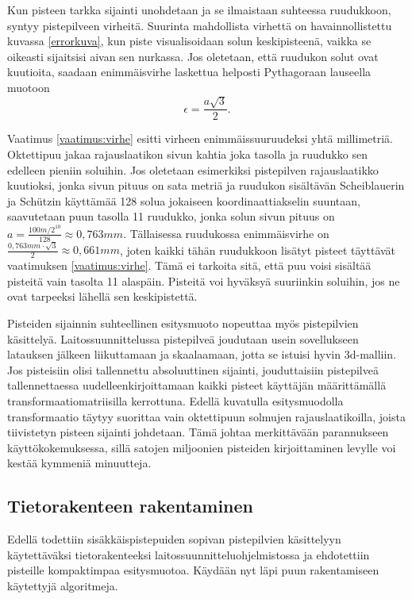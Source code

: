 Kun pisteen tarkka sijainti unohdetaan ja se ilmaistaan suhteessa ruudukkoon, syntyy pistepilveen virheitä. Suurinta mahdollista virhettä on havainnollistettu kuvassa \ref{errorkuva}, kun piste visualisoidaan solun keskipisteenä, vaikka se oikeasti sijaitsisi aivan sen nurkassa. Jos oletetaan, että ruudukon solut ovat kuutioita, saadaan enimmäisvirhe laskettua helposti Pythagoraan lauseella muotoon 
\begin{equation}
    \epsilon = \frac{a \sqrt{3}}{2}.      
\end{equation}

Vaatimus \ref{vaatimus:virhe} esitti virheen enimmäissuuruudeksi yhtä millimetriä. Oktettipuu jakaa rajauslaatikon sivun kahtia joka tasolla ja ruudukko sen edelleen pieniin soluihin. Jos oletetaan esimerkiksi pistepilven rajauslaatikko kuutioksi, jonka sivun pituus on sata metriä ja ruudukon sisältävän Scheiblauerin ja Schützin käyttämää 128 solua jokaiseen koordinaattiakselin suuntaan, saavutetaan puun tasolla 11 ruudukko, jonka solun sivun pituus on $a = \frac{100m/2^{10}}{128} \approx 0,763mm$. Tällaisessa ruudukossa enimmäisvirhe on $\frac{0,763mm \cdot \sqrt{3}}{2} \approx 0,661mm$, joten kaikki tähän ruudukkoon lisätyt pisteet täyttävät vaatimuksen \ref{vaatimus:virhe}. Tämä ei tarkoita sitä, että puu voisi sisältää pisteitä vain tasolta 11 alaspäin. Pisteitä voi hyväksyä suuriinkin soluihin, jos ne ovat tarpeeksi lähellä sen keskipistettä.

Pisteiden sijainnin suhteellinen esitysmuoto nopeuttaa myös pistepilvien käsittelyä. Laitossuunnittelussa pistepilveä joudutaan usein sovellukseen latauksen jälkeen liikuttamaan ja skaalaamaan, jotta se istuisi hyvin 3d-malliin. Jos pisteisiin olisi tallennettu absoluuttinen sijainti, jouduttaisiin pistepilveä tallennettaessa uudelleenkirjoittamaan kaikki pisteet käyttäjän määrittämällä transformaatiomatriisilla kerrottuna. Edellä kuvatulla esitysmuodolla transformaatio täytyy suorittaa vain oktettipuun solmujen rajauslaatikoilla, joista tiivistetyn pisteen sijainti johdetaan. Tämä johtaa merkittävään parannukseen käyttökokemuksessa, sillä satojen miljoonien pisteiden kirjoittaminen levylle voi kestää kymmeniä minuutteja.

\subsection{Tietorakenteen rakentaminen}

Edellä todettiin sisäkkäispistepuiden sopivan pistepilvien käsittelyyn käytettäväksi tietorakenteeksi laitossuunnitteluohjelmistossa ja ehdotettiin pisteille kompaktimpaa esitysmuotoa. Käydään nyt läpi puun rakentamiseen käytettyjä algoritmeja.

